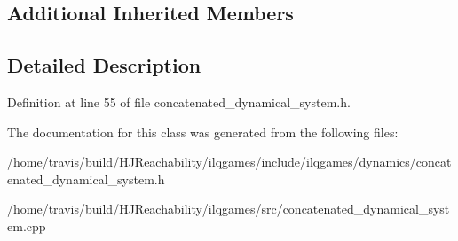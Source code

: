 \subsection*{Additional Inherited Members}


\subsection{Detailed Description}


Definition at line 55 of file concatenated\+\_\+dynamical\+\_\+system.\+h.



The documentation for this class was generated from the following files\+:\begin{DoxyCompactItemize}
\item 
/home/travis/build/\+H\+J\+Reachability/ilqgames/include/ilqgames/dynamics/concatenated\+\_\+dynamical\+\_\+system.\+h\item 
/home/travis/build/\+H\+J\+Reachability/ilqgames/src/concatenated\+\_\+dynamical\+\_\+system.\+cpp\end{DoxyCompactItemize}
